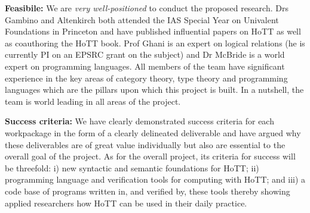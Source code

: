 \documentclass[a4paper,11pt]{article}
\begin{document}
\vspace*{0.02in}

{\bf Feasibile:} We are {\em very well-positioned} to conduct the
proposed research. Drs Gambino and Altenkirch both attended the IAS
Special Year on Univalent Foundations in Princeton and have published
influential papers on HoTT as well as coauthoring the HoTT book. Prof
Ghani is an expert on logical relations (he is currently PI on an
EPSRC grant on the subject) and Dr McBride is a world expert on
programming languages. All members of the team have significant
experience in the key areas of category theory, type theory and
programming languages which are the pillars upon which this project is
built. In a nutshell, the team is world leading in all areas of the
project.

\vspace*{0.02in}

{\bf Success criteria:} We have clearly demonstrated success criteria
for each workpackage in the form of a clearly delineated deliverable
and have argued why these deliverables are of great value individually
but also are essential to the overall goal of the project. As for the
overall project, its criteria for success will be threefold: i) new
syntactic and semantic foundations for HoTT; ii) programming language
and verification tools for computing with HoTT; and iii) a code base
of programs written in, and verified by, these tools thereby showing
applied researchers how HoTT can be used in their daily practice.


\vspace*{0.02in}
\end{document}
